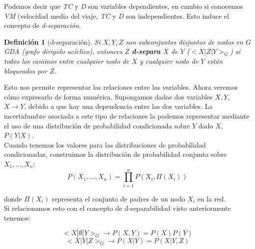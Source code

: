 \documentclass{article}
\theoremstyle{definition_wo_parentheses}
\newtheorem{definicion}{Definición}
\begin{document}
\begin{center}
\end{center}

Podemos decir que \textit{TC} y \textit{D} son variables dependientes, en cambio si conocemos \textit{VM} (velocidad media del viaje, \textit{TC} y \textit{D} son independientes. Esto induce el concepto de \textit{d-separación}.

\begin{definicion}[d-separación]
	Si $X,Y,Z$ son subconjuntos disjuntos de nodos en $G$ GDA (grafo dirigido acíclico), entonces $Z$ \textbf{d-separa} $X$ de $Y$ ($<X|Z|Y>_G$) si todos los caminos entre cualquier nodo de $X$ y cualquier nodo de $Y$ están bloqueados por $Z$. 
\end{definicion}

Esto nos permite representar las relaciones entre las variables. Ahora veremos cómo expresarlo de forma numérica. Supongamos dadas dos variables $X,Y$, $X \rightarrow Y$, debido a que hay una dependencia entre las dos variables. La incertidumbre asociada a este tipo de relaciones la podemos representar mediante el uso de una distribución de probabilidad condicionada sobre $Y$ dado $X$, $P(Y|X)$.\\
Cuando tenemos los valores para las distribuciones de probabilidad condicionadas, construimos la distribución de probabilidad conjunta sobre $X_1, \dots, X_n$:
\[ P(X_1, \dots,X_n) = \prod\limits_{i=1}^n P(X_i,\Pi(X_i))\]

donde $\Pi(X_i)$ representa el conjunto de padres de un nodo $X_i$ en la red.\\

Si relacionamos esto con el concepto de d-separabilidad visto anteriormente tenemos:

\begin{equation}
	<X|\emptyset|Y>_G \rightarrow P(X,Y) = P(X) P(Y)
\end{equation}
\begin{equation}
	<X|Y|Z>_G \rightarrow P(X|Y) = P(X|Y,Z)
\end{equation}
\end{document}

